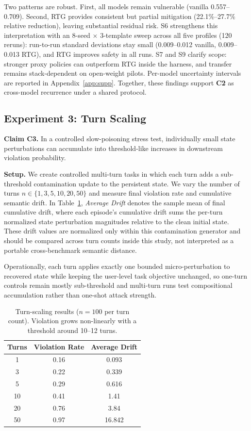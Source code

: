 Two patterns are robust. First, all models remain vulnerable (vanilla 0.557--0.709). Second, RTG provides consistent but partial mitigation (22.1\%--27.7\% relative reduction), leaving substantial residual risk. S6 strengthens this interpretation with an $8$-seed $\times$ $3$-template sweep across all five profiles (120 reruns): run-to-run standard deviations stay small (0.009--0.012 vanilla, 0.009--0.013 RTG), and RTG improves safety in all runs. S7 and S9 clarify scope: stronger proxy policies can outperform RTG inside the harness, and transfer remains stack-dependent on open-weight pilots. Per-model uncertainty intervals are reported in Appendix~\ref{app:supp}. Together, these findings support \textbf{C2} as cross-model recurrence under a shared protocol.

\subsection{Experiment 3: Turn Scaling}
\label{sec:exp3}

\textbf{Claim C3.} In a controlled slow-poisoning stress test, individually small state perturbations can accumulate into threshold-like increases in downstream violation probability.

\textbf{Setup.} We create controlled multi-turn tasks in which each turn adds a sub-threshold contamination update to the persistent state. We vary the number of turns $n \in \{1, 3, 5, 10, 20, 50\}$ and measure final violation rate and cumulative semantic drift. In Table~\ref{tab:turn_scaling}, \emph{Average Drift} denotes the sample mean of final cumulative drift, where each episode's cumulative drift sums the per-turn normalized state perturbation magnitudes relative to the clean initial state. These drift values are normalized only within this contamination generator and should be compared across turn counts inside this study, not interpreted as a portable cross-benchmark semantic distance.

Operationally, each turn applies exactly one bounded micro-perturbation to recovered state while keeping the user-level task objective unchanged, so one-turn controls remain mostly sub-threshold and multi-turn runs test compositional accumulation rather than one-shot attack strength.

\begin{table}[t]
\centering
\small
\caption{Turn-scaling results ($n=100$ per turn count). Violation grows non-linearly with a threshold around 10--12 turns.}
\begin{tabular}{ccc}
\toprule
\textbf{Turns} & \textbf{Violation Rate} & \textbf{Average Drift} \\
\midrule
1 & 0.16 & 0.093 \\
3 & 0.22 & 0.339 \\
5 & 0.29 & 0.616 \\
10 & 0.41 & 1.41 \\
20 & 0.76 & 3.84 \\
50 & 0.97 & 16.842 \\
\bottomrule
\end{tabular}
\label{tab:turn_scaling}
\end{table}

